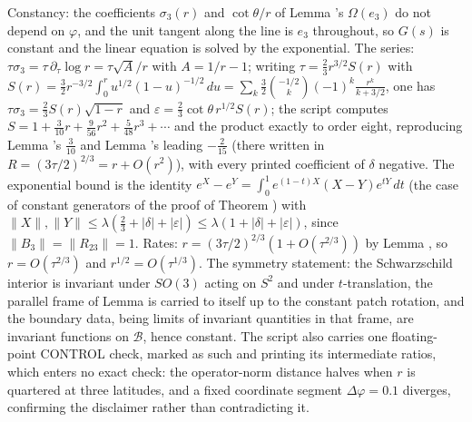 Constancy: the coefficients $\sigma_{3}(r)$ and $\cot\theta/r$ of Lemma 's $\Omega(e_{3})$ do not depend on $\varphi$, and the unit tangent along the line is $e_{3}$ throughout, so $G(s)$ is constant and the linear equation is solved by the exponential. The series: $\tau\sigma_{3} = \tau\,\partial_{\tau}\log r = \tau\sqrt{A}/r$ with $A = 1/r - 1$; writing $\tau = \tfrac23 r^{3/2} S(r)$ with $S(r) = \tfrac32 r^{-3/2}\int_{0}^{r} u^{1/2}(1-u)^{-1/2}\,du = \sum_{k} \tfrac{3}{2}\binom{-1/2}{k}(-1)^{k}\frac{r^{k}}{k + 3/2}$, one has $\tau\sigma_{3} = \tfrac23 S(r)\sqrt{1 - r}$ and $\varepsilon = \tfrac23 \cot\theta\, r^{1/2} S(r)$; the script computes $S = 1 + \tfrac{3}{10} r + \tfrac{9}{56} r^{2} + \tfrac{5}{48} r^{3} + \cdots$ and the product exactly to order eight, reproducing Lemma 's $\tfrac{3}{10}$ and Lemma 's leading $-\tfrac{2}{15}$ (there written in $R = (3\tau/2)^{2/3} = r + O(r^{2})$), with every printed coefficient of $\delta$ negative. The exponential bound is the identity $e^{X} - e^{Y} = \int_{0}^{1} e^{(1-t)X}(X - Y)e^{tY}\,dt$ (the case of constant generators of the proof of Theorem ) with $\|X\|, \|Y\| \le \lambda(\tfrac23 + |\delta| + |\varepsilon|) \le \lambda(1 + |\delta| + |\varepsilon|)$, since $\|B_3\| = \|R_{23}\| = 1$. Rates: $r = (3\tau/2)^{2/3}(1 + O(\tau^{2/3}))$ by Lemma , so $r = O(\tau^{2/3})$ and $r^{1/2} = O(\tau^{1/3})$. The symmetry statement: the Schwarzschild interior is invariant under $SO(3)$ acting on $S^{2}$ and under $t$-translation, the parallel frame of Lemma  is carried to itself up to the constant patch rotation, and the boundary data, being limits of invariant quantities in that frame, are invariant functions on $\mathcal{B}$, hence constant. The script also carries one floating-point CONTROL check, marked as such and printing its intermediate ratios, which enters no exact check: the operator-norm distance halves when $r$ is quartered at three latitudes, and a fixed coordinate segment $\Delta\varphi = 0.1$ diverges, confirming the disclaimer rather than contradicting it.
